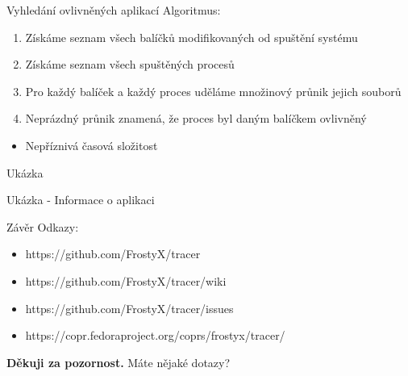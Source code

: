 \documentclass{beamer}
\newcommand{\separator}{\vspace{15pt}}
\begin{document}
	\begin{frame}{Vyhledání ovlivněných aplikací}
		Algoritmus:
		\begin{enumerate}
			\item Získáme seznam všech balíčků modifikovaných od spuštění systému
			\item Získáme seznam všech spuštěných procesů
			\item Pro každý balíček a každý proces uděláme množinový průnik jejich souborů
			\item Neprázdný průnik znamená, že proces byl daným balíčkem ovlivněný
		\end{enumerate}
		\separator
		\begin{itemize}
			\item Nepříznivá časová složitost
		\end{itemize}
	\end{frame}


	\begin{frame}{Ukázka}
		
	\end{frame}

	\begin{frame}{Ukázka - Informace o aplikaci}
		
	\end{frame}

	\begin{frame}{Závěr}
		Odkazy:
		\begin{itemize}
			\item https://github.com/FrostyX/tracer
			\item https://github.com/FrostyX/tracer/wiki
			\item https://github.com/FrostyX/tracer/issues
			\item https://copr.fedoraproject.org/coprs/frostyx/tracer/
		\end{itemize}
		\vspace{70pt}
		\centerline{\textbf{Děkuji za pozornost.} Máte nějaké dotazy?}
	\end{frame}
\end{document}
